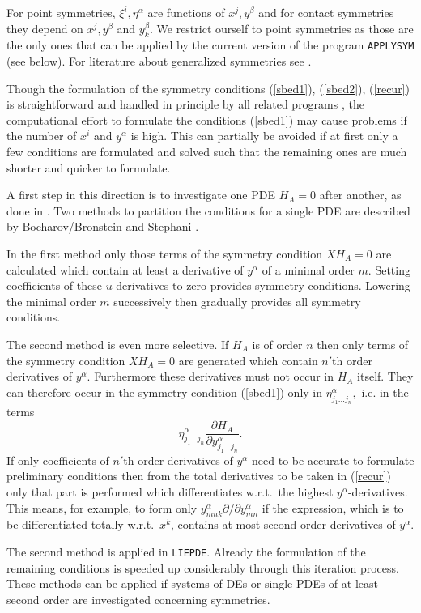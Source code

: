 For point symmetries, $\xi^i, \eta^\alpha$ are functions of $x^j,
y^\beta$ and for contact symmetries they depend on $x^j, y^\beta$ and
$y^\beta_k.$ We restrict ourself to point symmetries as those are the only
ones that can be applied by the current version of the program {\tt APPLYSYM}
(see below). For literature about generalized symmetries see \cite{WHer}.

Though the formulation of the symmetry conditions (\ref{sbed1}),
(\ref{sbed2}), (\ref{recur})
is straightforward and handled in principle by all related
programs \cite{WHer}, the computational effort to formulate
the conditions (\ref{sbed1}) may cause problems if
the number of $x^i$ and $y^\alpha$ is high.  This can
partially be avoided if at first only a few conditions are formulated
and solved such that the remaining ones are much shorter and quicker to
formulate.

A first step in this direction is to investigate one PDE $H_A = 0$
after another, as done in \cite{Cham}.  Two methods to partition the
conditions for a single PDE are described by Bocharov/Bronstein
\cite{Alex} and Stephani \cite{Step}.

In the first method only those terms of the symmetry condition
$X H_A = 0$ are calculated which contain
at least a derivative of $y^\alpha$ of a minimal order $m.$
Setting coefficients
of these $u$-derivatives to zero provides symmetry conditions. Lowering the
minimal order $m$ successively then gradually provides all symmetry conditions.

The second method is even more selective. If $H_A$ is of order $n$
then only terms of the symmetry condition $X H_A = 0$ are generated which
contain $n'$th order derivatives of $y^\alpha.$ Furthermore these derivatives
must not occur in $H_A$ itself. They can therefore occur
in the symmetry condition
(\ref{sbed1}) only in
$\eta^\alpha_{j_1\ldots j_n},$ i.e. in the terms
\[\eta^\alpha_{j_1\ldots j_n}
\frac{\partial H_A}{\partial y^\alpha_{j_1\ldots j_n}}. \]
If only coefficients of $n'$th order derivatives of $y^\alpha$ need to be
accurate to formulate preliminary conditions
then from the total derivatives to be taken in
(\ref{recur}) only that part is performed which differentiates w.r.t.\ the
highest $y^\alpha$-derivatives.
This means, for example, to form only
$y^\alpha_{mnk} \partial/\partial y^\alpha_{mn} $
if the expression, which is to be differentiated totally w.r.t.\ $x^k$,
contains at most second order derivatives of $y^\alpha.$

The second method is applied in {\tt LIEPDE}.
Already the formulation of the remaining conditions is speeded up
considerably through this iteration process. These methods can be applied if
systems of DEs or single PDEs of at least second order are investigated
concerning symmetries.
